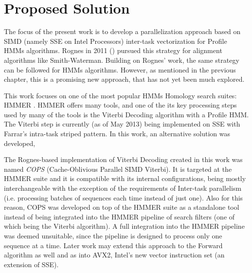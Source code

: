 


\section{Proposed Solution}

The focus of the present work is to develop a parallelization approach based on SIMD (namely SSE on Intel Processors) inter-task vectorization for Profile \acp{HMM} algorithms. Rognes in 2011 (\cite{rognes2011}) pursued this strategy for alignment algorithms like Smith-Waterman. Building on Rognes' work, the same strategy can be followed for \acp{HMM} algorithms. 
However, as mentioned in the previous chapter, this is a promising new approach, that has not yet been much explored.

This work focuses on one of the most popular \acp{HMM} Homology search suites: HMMER \cite{hmmer3}. HMMER offers many tools, and one of the its key processing steps used by many of the tools is the Viterbi Decoding algorithm with a Profile \ac{HMM}. The Viterbi step is currently (as of May 2013) being implemented on SSE with Farrar's intra-task striped pattern. In this work, an alternative solution was developed, 

The Rognes-based implementation of Viterbi Decoding created in this work was named \emph{COPS} (Cache-Oblivious Parallel SIMD Viterbi). It is targeted at the HMMER suite and it is compatible with its internal configurations, being mostly interchangeable with the exception of the requirements of Inter-task parallelism (i.e. processing batches of sequences each time instead of just one). Also for this reason, COPS was developed on top of the HMMER suite as a standalone tool instead of being integrated into the HMMER pipeline of search filters (one of which being the Viterbi algorithm). A full integration into the HMMER pipeline was deemed unsuitable, since the pipeline is designed to process only one sequence at a time. Later work may extend this approach to the Forward algorithm as well and as into AVX2, Intel's new vector instruction set (an  extension of SSE).


